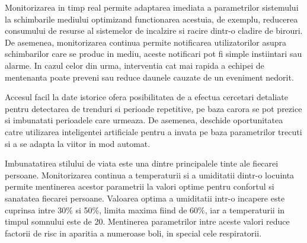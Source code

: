 Monitorizarea in timp real permite adaptarea imediata a parametrilor sistemului la schimbarile mediului optimizand functionarea acestuia, de exemplu,
reducerea consumului de resurse al sistemelor de incalzire si racire dintr-o cladire de birouri. De asemenea, monitorizarea continua permite notificarea 
utilizatorilor asupra schimbarilor care se produc in mediu, aceste notificari pot fi simple instiintari sau alarme. In cazul celor din urma, interventia 
cat mai rapida a echipei de mentenanta poate preveni sau reduce daunele cauzate de un eveniment nedorit.

Accesul facil la date istorice ofera posibilitatea de a efectua cercetari detaliate pentru detectarea de trenduri si perioade repetitive, pe baza
carora se pot prezice si imbunatati perioadele care urmeaza. De asemenea, deschide oportunitatea catre utilizarea inteligentei artificiale pentru 
a invata pe baza parametrilor trecuti si a se adapta la viitor in mod automat.

Imbunatatirea stilului de viata este una dintre principalele tinte ale fiecarei persoane. Monitorizarea continua a temperaturii si a umiditatii 
dintr-o locuinta permite mentinerea acestor parametrii la valori optime pentru confortul si sanatatea fiecarei persoane. Valoarea optima a umiditatii 
intr-o incapere este cuprinsa intre 30\% si 50\%, limita maxima fiind de 60\%, iar a temperaturii in timpul 
somnului este de 20.
Mentinerea parametrilor intre aceste valori reduce factorii de risc in aparitia a numeroase boli, in special cele respiratorii.

